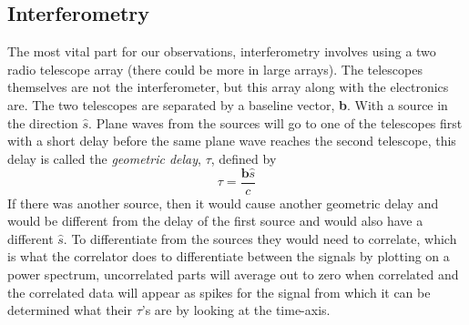 \documentclass[12 pt]{article}
\begin{document}
\subsection*{Interferometry}
The most vital part for our observations, interferometry involves using
a two radio telescope array (there could be more in large arrays). The
telescopes themselves are not the interferometer, but this array along
with the electronics are. The two telescopes are separated by a baseline
vector, \textbf{b}. With a source in the direction $\hat{s}$. Plane
waves from the sources will go to one of the telescopes first with a
short delay before the same plane wave reaches the second telescope, this
delay is called the \textit{geometric delay}, $\tau$, defined by 
\begin{equation}
  \tau = \frac{\textbf{b}\hat{s}}{c}
\end{equation}
If there was another source,  then it would cause another geometric
delay and would be different from the delay of the first source and
would also have
a different $\hat{s}$. To differentiate from the sources they would need
to correlate, which is what the correlator does to differentiate between the
signals by plotting on a power spectrum, uncorrelated parts will average
out to zero when correlated and the correlated data will appear as
spikes for the signal from which
it can be determined what their $\tau$'s are by looking at the time-axis.
\end{document}
